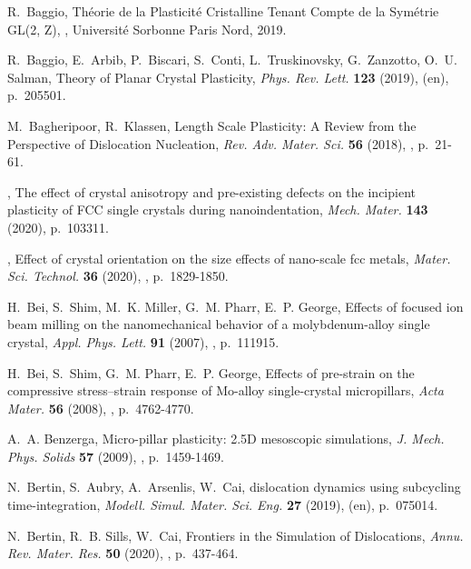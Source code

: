 \documentclass[CRPHYS,Unicode,manuscript]{cedram}
\begin{document}
\begin{thebibliography}{100}
R.~Baggio, {\og Th{\'e}orie de la Plasticit{\'e} Cristalline Tenant Compte de
  la Sym{\'e}trie GL(2, Z)\fg}, \cdrphdthesisname, Universit{\'e} Sorbonne
  Paris Nord, 2019.

R.~Baggio, E.~Arbib, P.~Biscari, S.~Conti, L.~Truskinovsky, G.~Zanzotto, O.~U.
  Salman, { Theory of Planar Crystal Plasticity\fg},
  \emph{Phys. Rev. Lett.} \textbf{123} (2019),  (en), p.~205501.

M.~Bagheripoor, R.~Klassen, {\og Length Scale Plasticity: A Review from the
  Perspective of Dislocation Nucleation\fg}, \emph{Rev. Adv. Mater. Sci.}
  \textbf{56} (2018), , p.~21-61.

\bysame , {\og The effect of crystal anisotropy and pre-existing defects on the
  incipient plasticity of {FCC} single crystals during nanoindentation\fg},
  \emph{Mech. Mater.} \textbf{143} (2020), p.~103311.

\bysame , {\og Effect of crystal orientation on the size effects of nano-scale
  fcc metals\fg}, \emph{Mater. Sci. Technol.} \textbf{36} (2020), , p.~1829-1850.

H.~Bei, S.~Shim, M.~K. Miller, G.~M. Pharr, E.~P. George, {\og Effects of
  focused ion beam milling on the nanomechanical behavior of a molybdenum-alloy
  single crystal\fg}, \emph{Appl. Phys. Lett.} \textbf{91} (2007), , p.~111915.

H.~Bei, S.~Shim, G.~M. Pharr, E.~P. George, {\og Effects of pre-strain on the
  compressive stress--strain response of Mo-alloy single-crystal
  micropillars\fg}, \emph{Acta Mater.} \textbf{56} (2008), ,
  p.~4762-4770.

A.~A. Benzerga, {\og Micro-pillar plasticity: 2.5D mesoscopic simulations\fg},
  \emph{J. Mech. Phys. Solids} \textbf{57} (2009), , p.~1459-1469.

N.~Bertin, S.~Aubry, A.~Arsenlis, W.~Cai, { dislocation
  dynamics using subcycling time-integration\fg}, \emph{Modell. Simul. Mater.
  Sci. Eng.} \textbf{27} (2019),  (en), p.~075014.

N.~Bertin, R.~B. Sills, W.~Cai, {\og Frontiers in the Simulation of
  Dislocations\fg}, \emph{Annu. Rev. Mater. Res.} \textbf{50} (2020),
  , p.~437-464.


\end{thebibliography}
\end{document}
